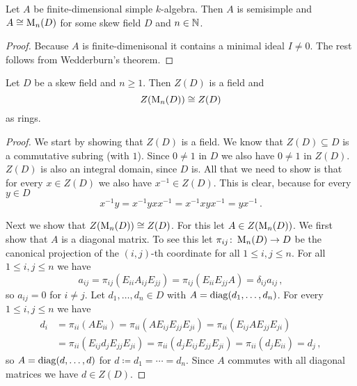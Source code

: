 \begin{corollary}
  Let $A$ be finite-dimensional simple $k$-algebra.
  Then $A$ is semisimple and $A \cong \operatorname{M}_n(D)$ for some skew field $D$ and $n \in \mathbb{N}$.
\end{corollary}
\begin{proof}
  Because $A$ is finite-dimenisonal it contains a minimal ideal $I \neq 0$.
  The rest follows from Wedderburn’s theorem.
\end{proof}


\begin{lemma}
  Let $D$ be a skew field and $n \geq 1$.
  Then $Z(D)$ is a field and
  \[
    Z(\operatorname{M}_n(D)) \cong Z(D)
  \]
  as rings.
\end{lemma}
\begin{proof}
  We start by showing that $Z(D)$ is a field.
  We know that $Z(D) \subseteq D$ is a commutative subring (with $1$).
  Since $0 \neq 1$ in $D$ we also have $0 \neq 1$ in $Z(D)$.
  $Z(D)$ is also an integral domain, since $D$ is.
  All that we need to show is that for every $x \in Z(D)$ we also have $x^{-1} \in Z(D)$.
  This is clear, because for every $y \in D$
  \[
      x^{-1} y
    = x^{-1} y x x^{-1}
    = x^{-1} x y x^{-1}
    = y x^{-1} \,.
  \]
  
  Next we show that $Z(\operatorname{M}_n(D)) \cong Z(D)$.
  For this let $A \in Z(\operatorname{M}_n(D))$.
  We first show that $A$ is a diagonal matrix.
  To see this let $\pi_{ij} \colon \operatorname{M}_n(D) \to D$ be the canonical projection of the $(i,j)$-th coordinate for all $1 \leq i,j \leq n$.
  For all $1 \leq i,j \leq n$ we have
  \[
      a_{ij}
    = \pi_{ij}(E_{ii} A_{ij} E_{jj})
    = \pi_{ij}(E_{ii} E_{jj} A)
    = \delta_{ij} a_{ij} \,,
  \]
  so $a_{ij} = 0$ for $i \neq j$.
  Let $d_1, \dotsc, d_n \in D$ with $A = \operatorname{diag}(d_1, \dotsc, d_n)$.
  For every $1 \leq i,j \leq n$ we have
  \begin{align*}
        d_i
    &=  \pi_{ii}(A E_{ii})
     =  \pi_{ii}(A E_{ij} E_{jj} E_{ji})
     =  \pi_{ii}(E_{ij} A E_{jj} E_{ji}) \\
    &=  \pi_{ii}(E_{ij} d_j E_{jj} E_{ji})
     =  \pi_{ii}(d_j E_{ij} E_{jj} E_{ji})
     =  \pi_{ii}(d_j E_{ii})
     =  d_j \,,
  \end{align*}
  so $A = \operatorname{diag}(d, \dotsc, d)$ for $d \coloneqq d_1 = \dotsb = d_n$.
  Since $A$ commutes with all diagonal matrices we have $d \in Z(D)$.
\end{proof}





